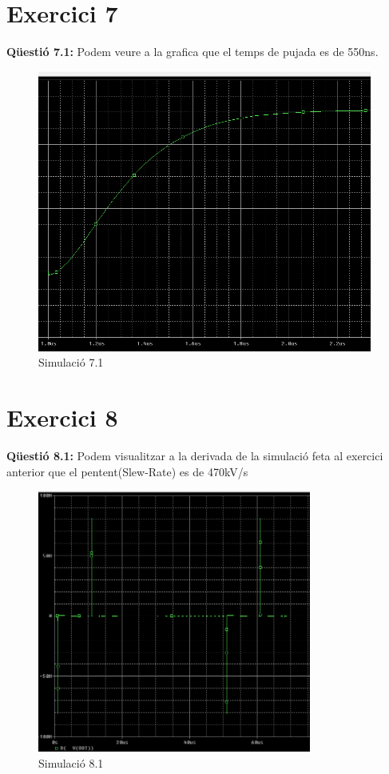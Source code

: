 \documentclass[12pt, a4papre]{article}
\begin{document}
	\section{Exercici 7} 
	
	\textbf{Qüestió 7.1:} Podem veure a la grafica que el temps de pujada es de 550ns.
	
	\begin{figure}[H]
		\begin{center}
		\includegraphics[width=110mm]{7_1_2zoom.PNG}
		\caption{Simulació 7.1}
		\end{center}
	\end{figure}
	
	\section{Exercici 8} 
	
	\textbf{Qüestió 8.1:} Podem visualitzar a la derivada de la simulació feta al exercici anterior que el pentent(Slew-Rate) es de 470kV/s
	
	\begin{figure}[H]
		\begin{center}
		\includegraphics[width=90mm]{8_1_derivada.PNG}
		\caption{Simulació 8.1}
		\end{center}
	\end{figure}
	
\end{document}
